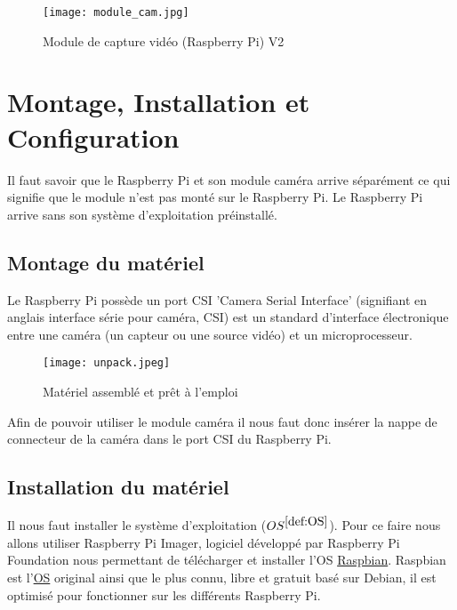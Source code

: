        \begin{figure}[ht]
            \centering        
            \texttt{[image: module\_cam.jpg]}
            \caption{Module de capture vidéo (Raspberry Pi) V2}
        \end{figure}
        
    \section{Montage, Installation et Configuration}
        Il faut savoir que le Raspberry Pi et son module caméra arrive séparément ce qui signifie que le module n’est pas monté sur le Raspberry Pi.
        Le Raspberry Pi arrive sans son système d'exploitation préinstallé.
            \subsection{Montage du matériel}
            Le Raspberry Pi possède un port CSI 'Camera Serial Interface' (signifiant en anglais interface série pour caméra, CSI) est un standard d'interface électronique entre une caméra (un capteur ou une source vidéo) et un microprocesseur.

            \begin{figure}[ht]
                \centering
                \texttt{[image: unpack.jpeg]} 
                \caption{Matériel assemblé et prêt à l'emploi}
            \end{figure}

            Afin de pouvoir utiliser le module caméra il nous faut donc insérer la nappe de connecteur de la caméra dans le port CSI du Raspberry Pi.
            \subsection{Installation du matériel}
            Il nous faut installer le système d'exploitation (\underline{$OS^{\ref{def:OS}}$}). Pour ce faire nous allons utiliser Raspberry Pi Imager, logiciel développé par Raspberry Pi Foundation nous permettant de télécharger et installer l'OS \underline{Raspbian}. Raspbian est l'\underline{OS} original ainsi que le plus connu, libre et gratuit basé sur Debian, il est optimisé pour fonctionner sur les différents Raspberry Pi.
            
            \vspace{0.2cm}

